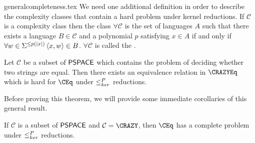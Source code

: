 \begin{filecontents}{generalcompleteness.tex}
We need one additional definition in order to describe the complexity classes that contain a hard problem under kernel reductions.
If $\mathcal{C}$ is a complexity class then the class $\forall\mathcal{C}$ is the set of languages $A$ such that there exists a language $B\in\mathcal{C}$ and a polynomial $p$ satisfying $x\in A$ if and only if $\forall w\in\Sigma^{\leq p(|x|)} \pair{x}{w}\in B$.
$\forall\mathcal{C}$ is called the .

\begin{theorem}\label{thm:generalcompleteness}
  Let $\mathcal{C}$ be a subset of $\PSPACE$ which contains the problem of deciding whether two strings are equal.
  Then there exists an equivalence relation in $\CRAZYEq$ which is hard for $\CEq$ under $\kr$ reductions.
\end{theorem}

Before proving this theorem, we will provide some immediate corollaries of this general result.

\begin{corollary}\label{cor:sufficient}
  If $\mathcal{C}$ is a subset of $\PSPACE$ and $\mathcal{C}=\CRAZY$, then $\CEq$ has a complete problem under $\kr$ reductions.
\end{corollary}


\end{filecontents}
